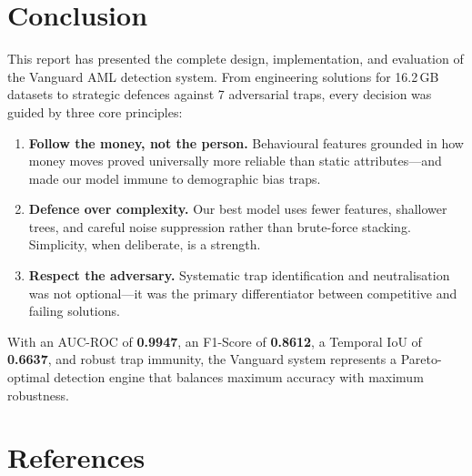 \documentclass[11pt, a4paper]{article}
\begin{document}
\section{Conclusion}

This report has presented the complete design, implementation, and evaluation of the
Vanguard AML detection system. From engineering solutions for 16.2\,GB datasets to
strategic defences against 7 adversarial traps, every decision was guided by three
core principles:

\begin{enumerate}[leftmargin=1.5em, itemsep=4pt]
    \item \textbf{Follow the money, not the person.}\quad
          Behavioural features grounded in how money moves proved universally more reliable
          than static attributes---and made our model immune to demographic bias traps.

    \item \textbf{Defence over complexity.}\quad
          Our best model uses fewer features, shallower trees, and careful noise suppression
          rather than brute-force stacking. Simplicity, when deliberate, is a strength.

    \item \textbf{Respect the adversary.}\quad
          Systematic trap identification and neutralisation was not optional---it was the
          primary differentiator between competitive and failing solutions.
\end{enumerate}

With an AUC-ROC of \textbf{0.9947}, an F1-Score of \textbf{0.8612}, a Temporal IoU of
\textbf{0.6637}, and robust trap immunity, the Vanguard system represents a Pareto-optimal
detection engine that balances maximum accuracy with maximum robustness.


\section*{References}
\end{document}

